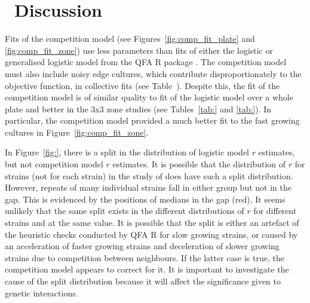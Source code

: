 \graphicspath{{images/}}

\section{\thesection~Discussion}
\label{sec:discussion}

Fits of the competition model (see Figures~\ref{fig:comp_fit_plate}
and \ref{fig:comp_fit_zone}) use less parameters than fits of either
the logistic or generalised logistic model from the QFA R package
\citep{Addinall2011,qfa2016}. The competition model must also include
noisy edge cultures, which contribute disproportionately to the
objective function, in collective fits (see Table~). Despite this, the
fit of the competition model is of similar quality to fit of the
logistic model over a whole plate and better in the 3x3 zone studies
(see Tables~\ref{tab:} and \ref{tab:}). In particular, the competition
model provided a much better fit to the fast growing cultures in
Figure~\ref{fig:comp_fit_zone}.

In Figure~\ref{fig:}, there is a split in the distribution of logistic
model \(r\) estimates, but not competition model \(r\) estimates. It
is possible that the distribution of \(r\) for strains (not for each
strain) in the study of \citet{Addinall2011} does have such a split
distribution. However, repeats of many individual strains fall in
either group but not in the gap. This is evidenced by the positions of
medians in the gap (red). It seems unlikely that the same split exists
in the different distributions of \(r\) for different strains and at
the same value. It is possible that the split is either an artefact of
the heuristic checks conducted by QFA R \citep{qfa2016} for slow
growing strains, or caused by an acceleration of faster growing
strains and deceleration of slower growing strains due to competition
between neighbours. If the latter case is true, the competition model
appears to correct for it. It is important to investigate the cause of
the split distribution because it will affect the significance given
to genetic interactions.

